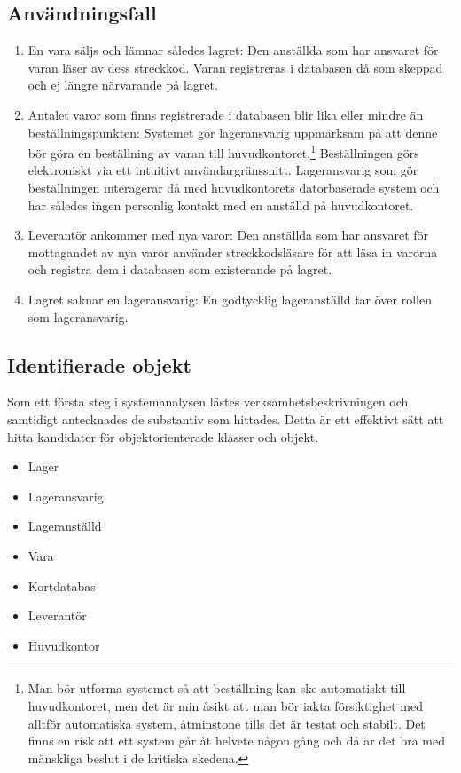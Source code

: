 \documentclass[a4paper,12pt]{article}
\begin{document}
\subsection{\textsf{Användningsfall}}
\begin{enumerate}
\item En vara säljs och lämnar således lagret: Den anställda som har ansvaret för varan läser av dess streckkod. Varan registreras i databasen då som skeppad och ej längre närvarande på lagret.
\item Antalet varor som finns registrerade i databasen blir lika eller mindre än beställningspunkten: Systemet gör lageransvarig uppmärksam på att denne bör göra en beställning av varan till huvudkontoret.\footnote{Man bör utforma systemet så att beställning kan ske automatiskt till huvudkontoret, men det är min åsikt att man bör iakta försiktighet med alltför automatiska system, åtminstone tills det är testat och stabilt. Det finns en risk att ett system går åt helvete någon gång och då är det bra med mänskliga beslut i de kritiska skedena.} Beställningen görs elektroniskt via ett intuitivt användargränssnitt. Lageransvarig som gör beställningen interagerar då med huvudkontorets datorbaserade system och har således ingen personlig kontakt med en anställd på huvudkontoret.
\item Leverantör ankommer med nya varor: Den anställda som har ansvaret för mottagandet av nya varor använder streckkodsläsare för att läsa in varorna och registra dem i databasen som existerande på lagret.
\item Lagret saknar en lageransvarig: En godtycklig lageranställd tar över rollen som lageransvarig.
\end{enumerate}


\subsection{\textsf{Identifierade objekt}}
Som ett första steg i systemanalysen lästes verksamhetsbeskrivningen och samtidigt antecknades de substantiv som hittades. Detta är ett effektivt sätt att hitta kandidater för objektorienterade klasser och objekt.

\begin{itemize}
\item Lager
\item Lageransvarig
\item Lageranställd
\item Vara
\item Kortdatabas
\item Leverantör
\item Huvudkontor
\end{itemize}
\end{document}
